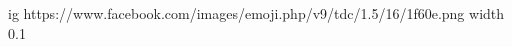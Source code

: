  
 
 
 
 
\ifcmt
  ig https://www.facebook.com/images/emoji.php/v9/tdc/1.5/16/1f60e.png
  width 0.1
\fi

